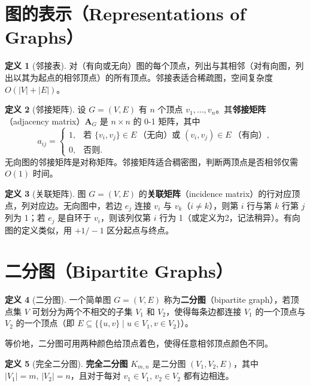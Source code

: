 \documentclass[UTF8,11pt,a4paper]{ctexbook}   %
\theoremstyle{definition}
\newtheorem{definition}{定义}[section]
\begin{document}
\section{图的表示（Representations of Graphs）}

\begin{definition}[邻接表]
对（有向或无向）图的每个顶点，列出与其相邻（对有向图，列出以其为起点的相邻顶点）的所有顶点。邻接表适合稀疏图，空间复杂度 $O(|V|+|E|)$。
\end{definition}

\begin{definition}[邻接矩阵]
设 $G=(V,E)$ 有 $n$ 个顶点 $v_1,\dots,v_n$。其\textbf{邻接矩阵}（adjacency matrix）$\mathbf{A}_G$ 是 $n \times n$ 的 0-1 矩阵，其中
\[
a_{ij} = \begin{cases}
1, & \text{若 } \{v_i,v_j\} \in E\ \text{（无向）或 } (v_i,v_j) \in E\ \text{（有向）}, \\
0, & \text{否则}.
\end{cases}
\]
无向图的邻接矩阵是对称矩阵。邻接矩阵适合稠密图，判断两顶点是否相邻仅需 $O(1)$ 时间。
\end{definition}

\begin{definition}[关联矩阵]
图 $G=(V,E)$ 的\textbf{关联矩阵}（incidence matrix）的行对应顶点，列对应边。无向图中，若边 $e_j$ 连接 $v_i$ 与 $v_k$（$i \neq k$），则第 $i$ 行与第 $k$ 行第 $j$ 列为 1；若 $e_j$ 是自环于 $v_i$，则该列仅第 $i$ 行为 1（或定义为2，记法稍异）。有向图的定义类似，用 $+1/-1$ 区分起点与终点。
\end{definition}

\section{二分图（Bipartite Graphs）}

\begin{definition}[二分图]
一个简单图 $G=(V,E)$ 称为\textbf{二分图}（bipartite graph），若顶点集 $V$ 可划分为两个不相交的子集 $V_1$ 和 $V_2$，使得每条边都连接 $V_1$ 的一个顶点与 $V_2$ 的一个顶点（即 $E \subseteq \{ \{u,v\} \mid u \in V_1, v \in V_2\}$）。
\end{definition}

等价地，二分图可用两种颜色给顶点着色，使得任意相邻顶点颜色不同。

\begin{definition}[完全二分图]
\textbf{完全二分图} $K_{m,n}$ 是二分图 $(V_1,V_2,E)$，其中 $|V_1|=m,\,|V_2|=n$，且对于每对 $v_1 \in V_1,\, v_2 \in V_2$ 都有边相连。
\end{definition}
\end{document}
